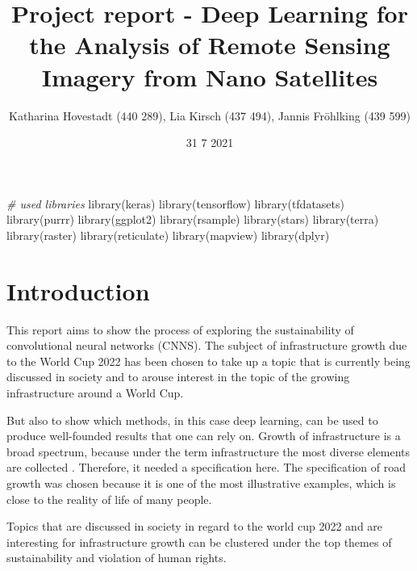 \documentclass[
]{article}
\title{Project report - Deep Learning for the Analysis of Remote Sensing
Imagery from Nano Satellites}
\author{Katharina Hovestadt (440 289), Lia Kirsch (437 494), Jannis
Fröhlking (439 599)}
\date{31 7 2021}
\newenvironment{Shaded}{\begin{snugshade}}{\end{snugshade}}
\newcommand{\CommentTok}[1]{\textcolor[rgb]{0.56,0.35,0.01}{\textit{#1}}}
\newcommand{\FunctionTok}[1]{\textcolor[rgb]{0.00,0.00,0.00}{#1}}
\newcommand{\NormalTok}[1]{#1}
\begin{document}
\maketitle

{
\setcounter{tocdepth}{2}
\tableofcontents
}
\begin{Shaded}
\begin{Highlighting}[]
\CommentTok{\# used libraries}
\FunctionTok{library}\NormalTok{(keras)}
\FunctionTok{library}\NormalTok{(tensorflow)}
\FunctionTok{library}\NormalTok{(tfdatasets)}
\FunctionTok{library}\NormalTok{(purrr)}
\FunctionTok{library}\NormalTok{(ggplot2)}
\FunctionTok{library}\NormalTok{(rsample)}
\FunctionTok{library}\NormalTok{(stars)}
\FunctionTok{library}\NormalTok{(terra)}
\FunctionTok{library}\NormalTok{(raster)}
\FunctionTok{library}\NormalTok{(reticulate)}
\FunctionTok{library}\NormalTok{(mapview)}
\FunctionTok{library}\NormalTok{(dplyr)}
\end{Highlighting}
\end{Shaded}

\hypertarget{introduction}{%
\section{Introduction}\label{introduction}}

This report aims to show the process of exploring the sustainability of
convolutional neural networks (CNNS). The subject of infrastructure
growth due to the World Cup 2022 has been chosen to take up a topic that
is currently being discussed in society and to arouse interest in the
topic of the growing infrastructure around a World Cup.

But also to show which methods, in this case deep learning, can be used
to produce well-founded results that one can rely on. Growth of
infrastructure is a broad spectrum, because under the term
infrastructure the most diverse elements are collected . Therefore, it
needed a specification here. The specification of road growth was chosen
because it is one of the most illustrative examples, which is close to
the reality of life of many people.

Topics that are discussed in society in regard to the world cup 2022 and
are interesting for infrastructure growth can be clustered under the top
themes of sustainability and violation of human rights.
\end{document}
